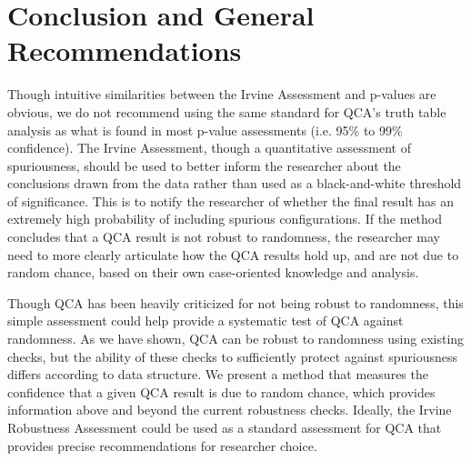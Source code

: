 \documentclass[]{article}
\begin{document}
{%


\section{Conclusion and General Recommendations}

Though intuitive similarities between the Irvine Assessment and p-values are obvious, we do not recommend using the same standard for QCA's truth table analysis as what is found in most p-value assessments (i.e. 95\% to 99\% confidence). The Irvine Assessment, though a quantitative assessment of spuriousness, should be used to better inform the researcher about the conclusions drawn from the data rather than used as a black-and-white threshold of significance. This is to notify the researcher of whether the final result has an extremely high probability of including spurious configurations. If the method concludes that a QCA result is not robust to randomness, the researcher may need to more clearly articulate how the QCA results hold up, and are not due to random chance, based on their own case-oriented knowledge and analysis. 

Though QCA has been heavily criticized for not being robust to randomness, this simple assessment could help provide a systematic test of QCA against randomness. As we have shown, QCA can be robust to randomness using existing checks, but the ability of these checks to sufficiently protect against spuriousness differs according to data structure. We present a method that measures the confidence that a given QCA result is due to random chance, which provides information above and beyond the current robustness checks. Ideally, the Irvine Robustness Assessment could be used as a standard assessment for QCA that provides precise recommendations for researcher choice. 




}
\end{document}

